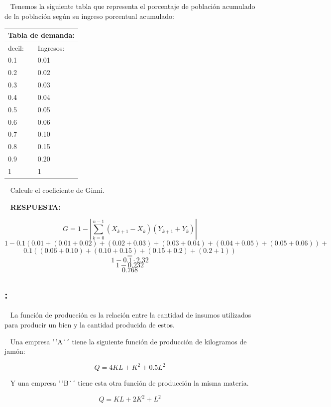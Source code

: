\documentclass[
  letterpaper,
  DIV=11,
  numbers=noendperiod]{scrreport}
\begin{document}
~ Tenemos la siguiente tabla que representa el porcentaje de población
acumulado de la población según su ingreso porcentual acumulado:

\begin{table}[H]
    \centering
    \begin{tabular}{|p{25mm}|p{25mm}|}
        \multicolumn{2}{c}{Tabla de demanda:} \\
        \hline
        decil: & Ingresos: \\ \hline
        0.1 & 0.01 \\ \hline
        0.2 & 0.02 \\ \hline
        0.3 & 0.03 \\ \hline
        0.4 & 0.04 \\ \hline
        0.5 & 0.05 \\ \hline
        0.6 & 0.06 \\ \hline
        0.7 & 0.10 \\ \hline
        0.8 & 0.15 \\ \hline
        0.9 & 0.20 \\ \hline
        1 & 1 \\ \hline
        \end{tabular}
\end{table}

~ Calcule el coeficiente de Ginni.

~ \textbf{RESPUESTA:}

\[G=1-\left|\sum_{k=0}^{n-1}\left(X_{k+1}-X_k\right)\left(Y_{k+1}+Y_k\right)\right| \]
\[1-0.1(0.01+(0.01+0.02)+(0.02+0.03)+(0.03+0.04)+(0.04+0.05)+(0.05+0.06))+\]
\[0.1((0.06+0.10)+(0.10+0.15)+(0.15+0.2)+(0.2+1))\] \[=\]
\[1-0.1\cdot 2.32\] \[1-0.232\] \[0.768\]

\hypertarget{section-29}{%
\subsection{:}\label{section-29}}

~ La función de producción es la relación entre la cantidad de insumos
utilizados para producir un bien y la cantidad producida de estos.

~ Una empresa '\,'A´´ tiene la siguiente función de producción de
kilogramos de jamón:

\[Q = 4KL + K^2 + 0.5L^2\]

~ Y una empresa '\,'B´´ tiene esta otra función de producción la misma
materia.

\[Q = KL + 2K^2 + L^2\]
\end{document}
